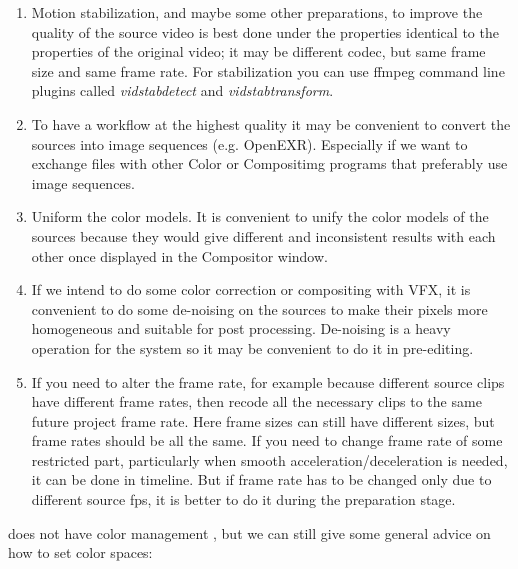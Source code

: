 \begin{enumerate}
	\item Motion stabilization, and maybe some other preparations, to improve the quality of the source video is best done under the properties identical to the properties of the original video; it may be different codec, but same frame size and same frame rate. For stabilization you can use ffmpeg command line plugins called \textit{vidstabdetect} and \textit{vidstabtransform}.
	\item To have a workflow at the highest quality it may be convenient to convert the sources into image sequences (e.g. OpenEXR). Especially if we want to exchange files with other Color or Compositimg programs that preferably use image sequences.
	\item Uniform the color models. It is convenient to unify the color models of the sources because they would give different and inconsistent results with each other once displayed in the Compositor window.
	\item If we intend to do some color correction or compositing with VFX, it is convenient to do some de-noising on the sources to make their pixels more homogeneous and suitable for post processing. De-noising is a heavy operation for the system so it may be convenient to do it in pre-editing.
	\item If you need to alter the frame rate, for example because different source clips have different frame rates, then recode all the necessary clips to the same future project frame rate. Here frame sizes can still have different sizes, but frame rates should be all the same.	If you need to change frame rate of some restricted part, particularly when smooth acceleration/deceleration is needed, it can be done in timeline. But if frame rate has to be changed only due to different source fps, it is better to do it during the preparation stage.
\end{enumerate}

\CGG{} does not have color management , but we can still give some general advice on how to set color spaces:

